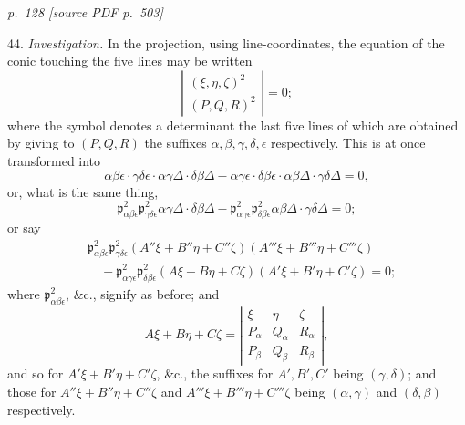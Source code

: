 \documentclass[11pt,a4paper]{article}
\newcommand{\sourcepage}[2]{%
  \bigskip
  \noindent\textit{p.~#1 [source PDF p.~#2]}%
  \par\smallskip
}
\newcommand{\p}{\mathfrak p}
\begin{document}
\sourcepage{128}{503}
44. \textit{Investigation.} In the projection, using line-coordinates, the equation of
the conic touching the five lines may be written
\[
\left|\begin{array}{c}
(\xi,\eta,\zeta)^2\\
(P,Q,R)^2
\end{array}\right|=0;
\]
where the symbol denotes a determinant the last five lines of which are obtained by
giving to $(P,Q,R)$ the suffixes $\alpha,\beta,\gamma,\delta,\epsilon$ respectively.
This is at once transformed into
\[
\alpha\beta\epsilon\cdot\gamma\delta\epsilon\cdot
\alpha\gamma\Delta\cdot\delta\beta\Delta
-\alpha\gamma\epsilon\cdot\delta\beta\epsilon\cdot
\alpha\beta\Delta\cdot\gamma\delta\Delta=0,
\]
or, what is the same thing,
\[
\p^2_{\alpha\beta\epsilon}\p^2_{\gamma\delta\epsilon}
\alpha\gamma\Delta\cdot\delta\beta\Delta
-\p^2_{\alpha\gamma\epsilon}\p^2_{\delta\beta\epsilon}
\alpha\beta\Delta\cdot\gamma\delta\Delta=0;
\]
or say
\[
\begin{aligned}
&\p^2_{\alpha\beta\epsilon}\p^2_{\gamma\delta\epsilon}
(A''\xi+B''\eta+C''\zeta)(A'''\xi+B'''\eta+C'''\zeta)\\
&\quad-\p^2_{\alpha\gamma\epsilon}\p^2_{\delta\beta\epsilon}
(A\xi+B\eta+C\zeta)(A'\xi+B'\eta+C'\zeta)=0;
\end{aligned}
\]
where $\p^2_{\alpha\beta\epsilon}$, \&c., signify as before; and
\[
A\xi+B\eta+C\zeta=
\left|\begin{array}{ccc}
\xi&\eta&\zeta\\
P_\alpha&Q_\alpha&R_\alpha\\
P_\beta&Q_\beta&R_\beta
\end{array}\right|,
\]
and so for $A'\xi+B'\eta+C'\zeta$, \&c., the suffixes for $A',B',C'$ being
$(\gamma,\delta)$; and those for $A''\xi+B''\eta+C''\zeta$ and
$A'''\xi+B'''\eta+C'''\zeta$ being $(\alpha,\gamma)$ and $(\delta,\beta)$
respectively.
\end{document}
